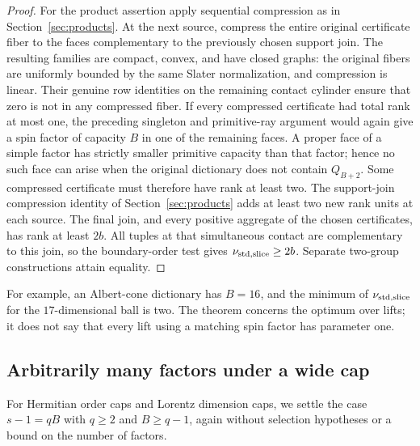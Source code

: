 \begin{proof}
For the product assertion apply sequential compression as in
Section~\ref{sec:products}. At the next source, compress the entire
original certificate fiber to the faces complementary to the previously
chosen support join. The resulting families are compact, convex, and
have closed graphs: the original fibers are uniformly bounded by the
same Slater normalization, and compression is linear. Their genuine
row identities on the remaining contact cylinder ensure that
zero is not in any compressed fiber. If every compressed certificate had
total rank at most one, the preceding singleton and primitive-ray
argument would again give a spin factor of capacity $B$ in one of the
remaining faces. A proper face of a simple factor has strictly smaller
primitive capacity than that factor; hence no such face can arise when
the original dictionary does not contain $Q_{B+2}$. Some compressed
certificate must therefore have rank at least two. The support-join
compression identity of Section~\ref{sec:products} adds at least two
new rank units at each source. The final join, and every positive
aggregate of the chosen certificates, has rank at least $2b$.
All tuples at that simultaneous contact are complementary to this join,
so the boundary-order test gives $\nu_{\mathrm{std},\mathrm{slice}}\geq2b$. Separate two-group
constructions attain equality.
\end{proof}

For example, an Albert-cone dictionary has $B=16$, and the minimum of
$\nu_{\mathrm{std},\mathrm{slice}}$ for the $17$-dimensional ball is two. The theorem concerns the
optimum over lifts; it does not say that every lift using a matching
spin factor has parameter one.

\subsection{Arbitrarily many factors under a wide cap}
For Hermitian order caps and Lorentz dimension caps, we settle the case
$s-1=qB$ with $q\geq2$ and $B\geq q-1$, again without selection
hypotheses or a bound on the number of factors.

